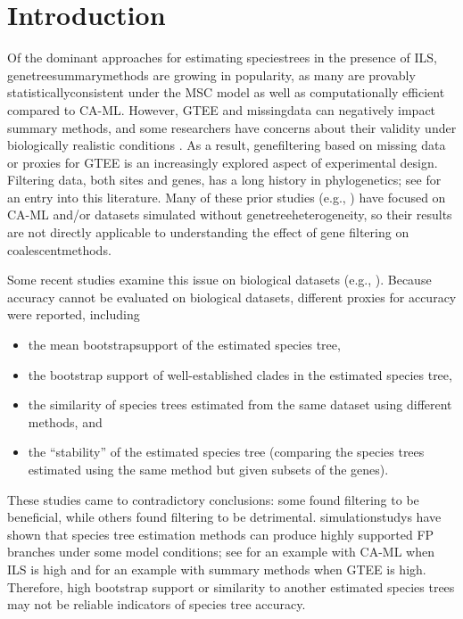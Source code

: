 \section{Introduction}
\label{sec:include-intro}
Of the dominant approaches for estimating \glspl{speciestree} in the presence of \gls{ILS}, \glspl{genetreesummarymethod} are growing in popularity, as many are provably \gls{statisticallyconsistent} under the \gls{MSC} model as well as computationally efficient compared to \gls{CA-ML}.
However, \gls{GTEE} and \gls{missingdata} can negatively impact summary methods, and some researchers have concerns about their validity under biologically realistic conditions \cite{gatesy2014phylo, springer2016gene}.
As a result, \gls{genefiltering} based on missing data or proxies for GTEE is an increasingly explored aspect of experimental design.
Filtering data, both \glspl{site} and \glspl{gene}, has a long history in phylogenetics; see \cite{streicher2016how, wiens2011missing, chen2015selecting} for an entry into this literature. 
Many of these prior studies (e.g., \cite{wiens2011missing, cho2011can, salichos2013inferring, salichos2014novel, betancur2014conserved, jiang2014should, dornburg2014phylogenetic, streicher2016phylogenomic, dornburg2017new}) have focused on CA-ML and/or datasets simulated without \gls{genetreeheterogeneity}, so their results are not directly applicable to understanding the effect of gene filtering on \glspl{coalescentmethod}.

Some recent studies examine this issue on biological datasets (e.g., \cite{liu2015estimating, chen2015selecting, xi2015genes, hosner2016empirical, huang2016unforeseen, meiklejohn2016analysis, simmons2016effects, streicher2016how, longo2017phylogenomic, blom2017accounting}).
Because accuracy cannot be evaluated on biological datasets, different proxies for accuracy were reported, including
\begin{itemize} 
	\item the mean \gls{bootstrapsupport} of the estimated species tree, 
	\item the bootstrap support of well-established clades in the estimated species tree, 
	\item the similarity of species trees estimated from the same dataset using different methods, and
	\item the ``stability'' of the estimated species tree (comparing the species trees estimated using the same method but given subsets of the genes). 
\end{itemize}
These studies came to contradictory conclusions: some found filtering to be beneficial, while others found filtering to be detrimental.
\Glspl{simulationstudy} have shown that species tree estimation methods can produce highly supported \gls{FP} branches under some model conditions; see \cite{kubatko2007inconsistency} for an example with CA-ML when ILS is high and \cite{bayzid2015weighted} for an example with summary methods when GTEE is high.
Therefore, high bootstrap support or similarity to another estimated species trees may not be reliable indicators of species tree accuracy.

